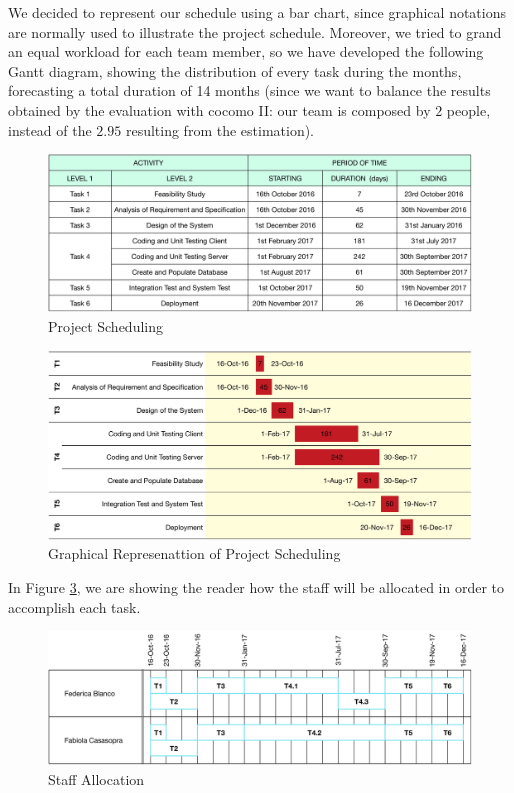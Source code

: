 We decided to represent our schedule using a bar chart, since graphical notations are normally used to illustrate the project schedule.
Moreover, we tried to grand an equal workload for each team member, so we have developed the following Gantt diagram, showing the distribution of every task during the months, forecasting a total duration of 14 months (since we want to balance the results obtained by the evaluation with \acs{cocomo} II: our team is composed by $2$ people, instead of the $2.95$ resulting from the estimation).

\begin{figure}[htbp]
\centering
\includegraphics[width=\textwidth]{Images/scheduling}
\caption{Project Scheduling}
\label{fig:sched}
\end{figure}

\begin{figure}[htbp]
\centering
\includegraphics[width=\textwidth]{Images/scheduling_bar_chart}
\caption{Graphical Represenattion of Project Scheduling}
\label{fig:chart_sched}
\end{figure}

\clearpage

In Figure \ref{fig:alloc}, we are showing the reader how the staff will be allocated in order to accomplish each task.

\begin{figure}[htbp]
\centering
\includegraphics[width=\textwidth]{Images/staff_allocation}
\caption{Staff Allocation}
\label{fig:alloc}
\end{figure}



